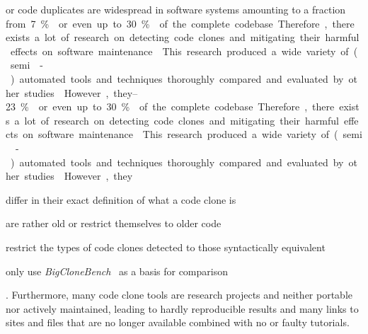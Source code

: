 \documentclass[10pt,journal,compsoc]{IEEEtran}
\begin{document}
\maketitle

\IEEEdisplaynontitleabstractindextext

\IEEEpeerreviewmaketitle



 or code duplicates are widespread in software systems amounting to a fraction from~\qtyrange{7}{23}\percent~\cite{roy2009comparison,schulze2010code} or even up to \qty{30}\percent~\cite{wagner2013software,wagner2016functionally,kim2005empirical} of the complete codebase.
Therefore, there exists a lot of research on detecting code clones and mitigating their harmful effects on software maintenance~\cite{juergens2009code}. This research produced a wide
variety of (semi\nobreakdash-)automated tools and techniques thoroughly compared and evaluated by other studies~\cite{roy2009comparison,ain2019systematic}.
However, they \begin{inlist}
  \item differ in their exact definition of what a code clone is
  \item are rather old or restrict themselves to older code
  \item restrict the types of code clones detected to those syntactically equivalent
  \item only use \textsl{BigCloneBench}~\cite{svajlenko2021bigclonebench} as a basis for comparison
\end{inlist}.
Furthermore, many code clone tools are research projects and neither portable nor actively maintained, leading to hardly reproducible results and many links to sites and files that are no longer available combined with no or faulty tutorials.
\end{document}
